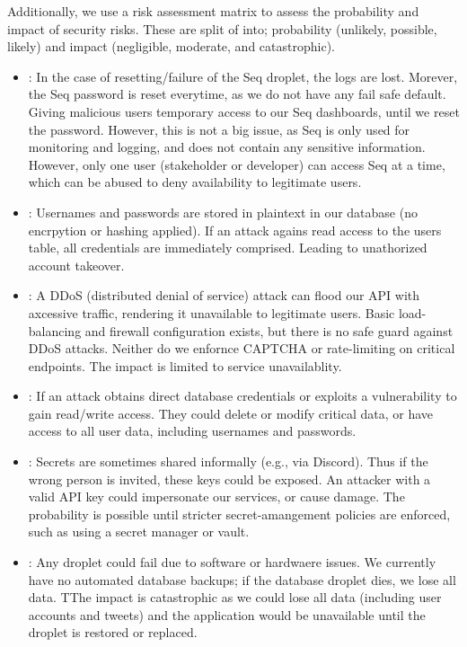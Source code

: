 Additionally, we use a risk assessment matrix to assess the probability and impact of security risks. 
These are split of into; probability (unlikely, possible, likely) and impact (negligible, moderate, and catastrophic).
\begin{itemize}
      \item {}: In the case of resetting/failure of the Seq droplet, the logs are lost. Morever, the Seq password is reset everytime, as we do not have any fail safe default. Giving malicious users temporary access to our Seq dashboards, until we reset the password. However, this is not a big issue, as Seq is only used for monitoring and logging, and does not contain any sensitive information. However, only one user (stakeholder or developer) can access Seq at a time, which can be abused to deny availability to legitimate users.
      \item {}: Usernames and passwords are stored in plaintext in our database (no encrpytion or hashing applied). If an attack agains read access to the users table, all credentials are immediately comprised. Leading to unathorized account takeover. 
      \item {}: A DDoS (distributed denial of service) attack can flood our API with axcessive traffic, rendering it unavailable to legitimate users. Basic load-balancing and firewall configuration exists, but there is no safe guard against DDoS attacks. Neither do we enfornce CAPTCHA or rate-limiting on critical endpoints. The impact is limited to service unavailablity. 
      \item {}: If an attack obtains direct database credentials or exploits a vulnerability to gain read/write access. They could delete or modify critical data, or have access to all user data, including usernames and passwords.
      \item {}: Secrets are sometimes shared informally (e.g., via Discord). Thus if the wrong person is invited, these keys could be exposed. An attacker with a valid API key could impersonate our services, or cause damage. The probability is possible until stricter secret-amangement policies are enforced, such as using a secret manager or vault.
      \item {}: Any droplet could fail due to software or hardwaere issues. We currently have no automated database backups; if the database droplet dies, we lose all data. TThe impact is catastrophic as we could lose all data (including user accounts and tweets) and the application would be unavailable until the droplet is restored or replaced.
\end{itemize}

